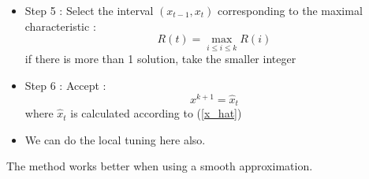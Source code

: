 \begin{itemize}
\begin{itemize}
called characteristic of the interval and where :
\begin{equation}
\hat{x}_i=\frac{-z_i+z_{i-1}+z_i'x_i-z_{i-1}'x_{i-1}+0.5m\(x_i^2-x_{i-1}^2\)^2}{m\(x_i-x_{i-1}\)+z_i'-z_{i-1}'} \label{x_hat}
\end{equation}
\item Step 5 : Select the interval $(x_{t-1},x_t)$ corresponding to the maximal characteristic :
\begin{equation}
R(t) = \max_{i\leq i \leq k} R(i)
\end{equation} 
if there is more than 1 solution, take the smaller integer
\item Step 6 : Accept :
\begin{equation}
x^{k+1} = \hat{x}_t
\end{equation}
where $\hat{x}_t$ is calculated according to (\ref{x_hat})
\item We can do the local tuning here also.
\end{itemize}
The method works better when using a smooth approximation.
\end{itemize}


